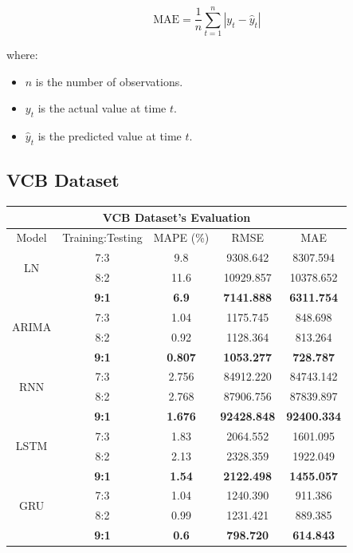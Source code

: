\documentclass{ieeeojies}
\begin{document}
\[
\text{MAE} = \frac{1}{n} \sum_{t=1}^{n} \left| y_t - \hat{y}_t \right|
\]

where:
\begin{itemize}
    \item \( n \) is the number of observations.
    \item \( y_t \) is the actual value at time \( t \).
    \item \( \hat{y}_t \) is the predicted value at time \( t \).
\end{itemize}

\subsection{VCB Dataset} 
\begin{table}[H]
    \centering
    \begin{tabular}{|c|c|c|c|c|}
         \hline
         \multicolumn{5}{|c|}{\textbf{VCB Dataset's Evaluation}}\\
         \hline
         \centering Model & Training:Testing & MAPE (\%) & RMSE & MAE\\
         \hline
         \multirow{2}{*}{LN} & 7:3 & 9.8 & 9308.642 & 8307.594 \\ & 8:2 & 11.6 & 10929.857 & 10378.652 \\ & \textbf{9:1} & \textbf{6.9} & \textbf{7141.888} & \textbf{6311.754}\\
         \hline
         \multirow{2}{*}{ARIMA} & 7:3&1.04&1175.745&848.698\\ & 8:2&0.92&1128.364&813.264 \\ & \textbf{9:1} & \textbf{0.807} & \textbf{1053.277} & \textbf{728.787}\\
         \hline
         \multirow{2}{*}{RNN} & 7:3 & 2.756 & 84912.220 & 84743.142 \\ 
& 8:2 & 2.768 & 87906.756 & 87839.897 \\ 
& \textbf{9:1} & \textbf{1.676} & \textbf{92428.848} & \textbf{92400.334} \\
         \hline
         \multirow{2}{*}{LSTM} & 7:3 &  1.83 &  2064.552 & 1601.095 \\ & 8:2 &  2.13 & 2328.359 & 1922.049 \\ & \textbf{9:1} &\textbf{1.54}  & \textbf{2122.498} &\textbf{1455.057}\\
         \hline
         \multirow{2}{*}{GRU} & 7:3 & 1.04 & 1240.390 & 911.386 \\ & 8:2 & 0.99 & 1231.421 & 889.385 \\ & \textbf{9:1} & \textbf{0.6} & \textbf{798.720} & \textbf{614.843}\\

\end{tabular}
\end{table}
\end{document}
